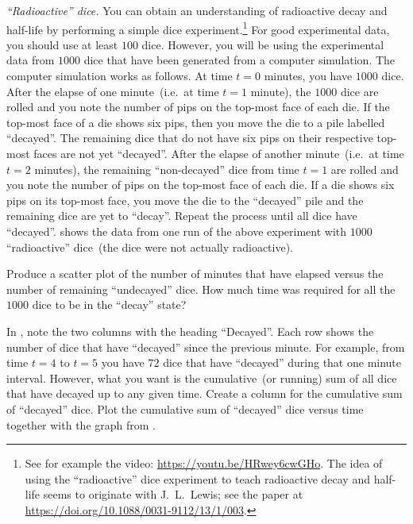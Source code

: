 \documentclass[a4paper,oneside,12pt]{article}
\begin{document}
\begin{problem}
\item\label{prob:radioactive_dice}
  \emph{``Radioactive'' dice.}
  You can obtain an understanding of radioactive decay and half-life
  by performing a simple dice experiment.\footnote{
    See for example the video:
    \url{https://youtu.be/HRwey6cwGHo}.  The idea of using the
    ``radioactive'' dice experiment to teach radioactive decay and
    half-life seems to originate with J.~L.~Lewis; see the paper at
    \url{https://doi.org/10.1088/0031-9112/13/1/003}.
  }
  For good experimental data, you should use at least $100$ dice.
  However, you will be using the experimental data from $1000$ dice
  that have been generated from a computer simulation.  The computer
  simulation works as follows.  At time $t = 0$ minutes, you have
  $1000$ dice.  After the elapse of one minute~(i.e.~at time $t = 1$
  minute), the $1000$ dice are rolled and you note the number of pips
  on the top-most face of each die.  If the top-most face of a die
  shows six pips, then you move the die to a pile labelled
  ``decayed''.  The remaining dice that do not have six pips on their
  respective top-most faces are not yet ``decayed''.  After the elapse
  of another minute~(i.e.~at time $t = 2$ minutes), the remaining
  ``non-decayed'' dice from time $t = 1$ are rolled and you note the
  number of pips on the top-most face of each die.  If a die shows six
  pips on its top-most face, you move the die to the ``decayed'' pile
  and the remaining dice are yet to ``decay''.  Repeat the process
  until all dice have ``decayed''.   shows
  the data from one run of the above experiment with $1000$
  ``radioactive'' dice~(the dice were not actually radioactive).
  \begin{packedenum}
  \item\label{subprob:radioactive_dice_graph_remaining}
    Produce a scatter plot of the number of minutes that have elapsed
    versus the number of remaining ``undecayed'' dice.  How much time
    was required for all the $1000$ dice to be in the ``decay'' state?

  \item\label{subprob:radioactive_dice_cumulative_decayed}
    In , note the two columns with the
    heading ``Decayed''.  Each row shows the number of dice that have
    ``decayed'' since the previous minute.  For example, from time
    $t = 4$ to $t = 5$ you have $72$ dice that have ``decayed'' during
    that one minute interval.  However, what you want is the
    cumulative~(or running) sum of all dice that have decayed up to
    any given time.  Create a column for the cumulative sum of
    ``decayed'' dice.  Plot the cumulative sum of ``decayed'' dice
    versus time together with the graph
    from .


\end{packedenum}
\end{problem}
\end{document}
